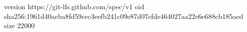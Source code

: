version https://git-lfs.github.com/spec/v1
oid sha256:1961d40aeba8fd59cec3eefb241c09e87d07cfde464027aa22e6e688cb185aed
size 22000
